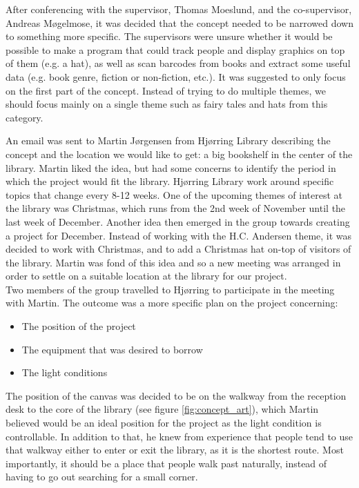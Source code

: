After conferencing with the supervisor, Thomas Moeslund, and the co-supervisor, Andreas M{\o}gelmose, it was decided that the concept needed to be narrowed down to something more specific. The supervisors were unsure whether it would be possible to make a program that could  track people and display graphics on top of them (e.g. a hat), as well as scan barcodes from books and extract some useful data (e.g. book genre, fiction or non-fiction, etc.). It was suggested to only focus on the first part of the concept. Instead of trying to do multiple themes, we should focus mainly on a single theme such as fairy tales and hats from this category.

An email was sent to Martin J{\o}rgensen from Hj{\o}rring Library describing the concept and the location we would like to get: a big bookshelf in the center of the library. Martin liked the idea, but had some concerns to identify the period in which the project would fit the library. Hj{\o}rring Library work around specific topics that change every 8-12 weeks. One of the upcoming themes of interest at the library was Christmas, which runs from the 2nd week of November until the last week of December. Another idea then emerged in the group towards creating a project for December. Instead of working with the H.C. Andersen theme, it was decided to work with Christmas, and to add a Christmas hat on-top of visitors of the library. Martin was fond of this idea and so a new meeting was arranged in order to settle on a suitable location at the library for our project.\\
Two members of the group travelled to Hj{\o}rring to participate in the meeting with Martin. The outcome was a more specific plan on the project concerning:

\begin{itemize}
\item The position of the project
\item The equipment that was desired to borrow
\item The light conditions
\end{itemize}

The position of the canvas was decided to be on the walkway from the reception desk to the core of the library (see figure \ref{fig:concept_art}), which Martin believed would be an ideal position for the project as the light condition is controllable. In addition to that, he knew from experience that people tend to use that walkway either to enter or exit the library, as it is the shortest route. Most importantly, it should be a place that people walk past naturally, instead of having to go out searching for a small corner.

